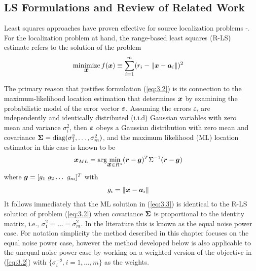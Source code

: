 \subsection{LS Formulations and Review of Related Work} %

Least squares approaches have proven effective for source localization problems \cite{SmithAbel} -\cite{BeckStLi}. For the localization problem at hand, the range-based least squares (R-LS) estimate refers to the solution of the problem
\begin{equation}\label{eq:3.2} %
\Min_{\Bx} f(\Bx) \equiv \sum_{i=1}^{m} (r_i - \|{\Bx} - {\Ba}_i\|)^2
\end{equation}

The primary reason that justifies formulation (\ref{eq:3.2}) is its connection to the maximum-likelihood location estimation that determines $\mbox{\boldmath$x$}$ by examining the probabilistic model of the error vector $\mbox{\boldmath${\varepsilon}$}$. Assuming the errors $\varepsilon_i$ are independently and identically distributed (i.i.d) Gaussian variables with zero mean and variance $\sigma_i^2$, then $\mbox{\boldmath${\varepsilon}$}$ obeys a Gaussian distribution with zero mean and covariance $\mbox{\boldmath${\Sigma}$} = \mbox{diag}(\sigma_1^2, \ldots, \sigma_m^2)$, and the maximum likelihood (ML) location estimator in this case is known to be
\begin{equation} \label{eq:3.3}%
\Bx_{ML} = \mbox{arg}\!\min_{{\Bx} \in R^n} (\Br - \Bg)^T\Sigma^{-1}(\Br - \Bg)
\end{equation}
where $\mbox{\boldmath$g$} = [g_1 \ g_2 \ldots \ g_m]^T$ with
\begin{equation} \label{eq:3.4}%
g_i = \|{\Bx} - {\Ba}_i\|
\end{equation}
It follows immediately that the ML solution in (\ref{eq:3.3}) is identical to the R-LS solution of problem (\ref{eq:3.2}) when covariance $\mbox{\boldmath${\Sigma}$}$ is proportional to the identity matrix, i.e., $\sigma_1^2=\ldots =\sigma_m^2$. In the literature this is known as the equal noise power case. For notation simplicity the method described in this chapter focuses on the equal noise power case, however the method developed below is also applicable to the unequal noise power case by working on a weighted version of the objective in  (\ref{eq:3.2})  with $\{\sigma_i^{-2}, i = 1, \ldots, m\}$ as the weights.


